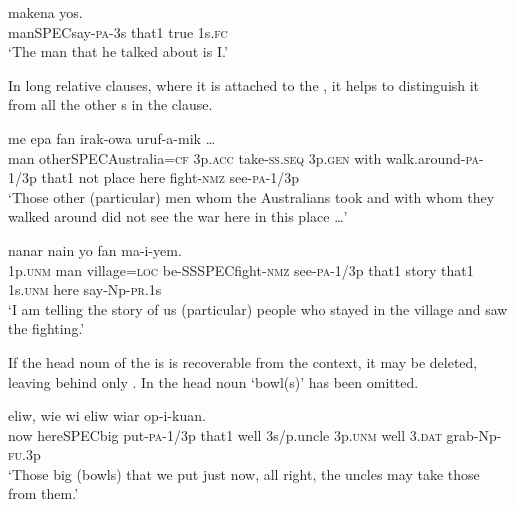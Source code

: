 \ea%
\label{ex:3:x1681}
 makena yos. \\
man\textsc{SPEC}say-\textsc{pa}-3s that1 true 1s.\textsc{fc}\\
\glt`The man that he talked about is I.'
\z

In long relative clauses, where it is attached to the , it helps to distinguish it from all the other s in the clause. 

\ea%
\label{ex:3:x1815}
\gll [\textstyleEmphasizedVernacularWords{Mua} \textstyleEmphasizedVernacularWords{papako} \textstyleEmphasizedVernacularWords{ena} Australia=ke wia aaw-ep wiena feekiya yiaw-e-mik nain] me epa fan irak-owa uruf-a-mik {\dots}\\
man other\textsc{SPEC}Australia=\textsc{cf} 3p.\textsc{acc} take-\textsc{ss}.\textsc{seq} 3p.\textsc{gen} with walk.around-\textsc{pa}-1/3p that1 not place here fight-\textsc{nmz} see-\textsc{pa}-1/3p\\
\glt`Those other (particular) men whom the Australians took and with whom they walked around did not see the war here in this place {\dots}'
\z

\ea%
\label{ex:3:x1683}
\gll [\textstyleEmphasizedVernacularWords{I} mua owowa=pa ik-ok \textstyleEmphasizedVernacularWords{ena} irakowa uruf-a-mik nain] nanar nain yo fan ma-i-yem.\\
1p.\textsc{unm} man village=\textsc{loc} be-SS\textsc{SPEC}fight-\textsc{nmz} see-\textsc{pa}-1/3p that1 story that1 1s.\textsc{unm} here say-Np-\textsc{pr}.1s\\
\glt`I am telling the story of us (particular) people who stayed in the village and saw the fighting.'
\z

If the head noun of the  is is recoverable from the context, it may be deleted, leaving behind only . In  the head noun  `bowl(s)' has been omitted.

\ea%
\label{ex:3:x1682}
 eliw, wie wi eliw wiar op-i-kuan.\\
now here\textsc{SPEC}big put-\textsc{pa}-1/3p that1 well 3s/p.uncle 3p.\textsc{unm} well 3.\textsc{dat} grab-Np-\textsc{fu}.3p\\
\glt`Those big (bowls) that we put just now, all right, the uncles may take those from them.'
\z

